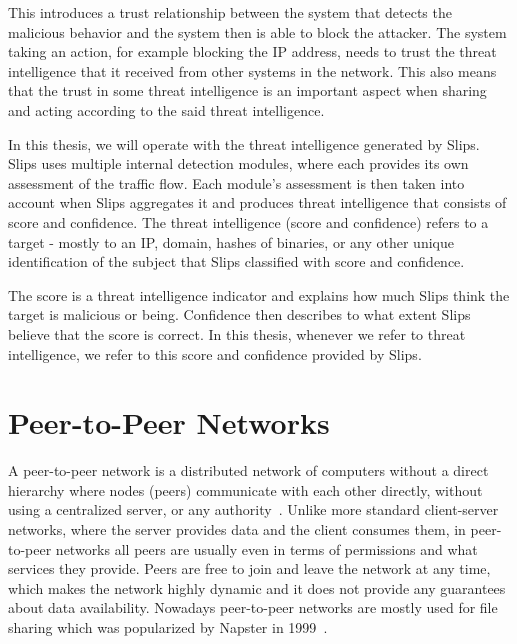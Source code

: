 This introduces a trust relationship between the system that detects the malicious behavior and the system then is able to block the attacker.
The system taking an action, for example blocking the IP address, needs to trust the threat intelligence that it received from other systems in the network.
This also means that the trust in some threat intelligence is an important aspect when sharing and acting according to the said threat intelligence.

In this thesis, we will operate with the threat intelligence generated by Slips.
Slips uses multiple internal detection modules, where each provides its own assessment of the traffic flow. 
Each module's assessment is then taken into account when Slips aggregates it and produces threat intelligence that consists of score and confidence.
The threat intelligence (score and confidence) refers to a target - mostly to an IP, domain, hashes of binaries, or any other unique identification of the subject that Slips classified with score and confidence.

The score is a threat intelligence indicator and explains how much Slips think the target is malicious or being.
Confidence then describes to what extent Slips believe that the score is correct.
In this thesis, whenever we refer to threat intelligence, we refer to this score and confidence provided by Slips.

\section{Peer-to-Peer Networks}
\label{sec:peer-to-peer-networks}
A peer-to-peer network is a distributed network of computers without a direct hierarchy where nodes (peers) communicate with each other directly, without using a centralized server, or any authority~\cite{schollmeier}.
Unlike more standard client-server networks, where the server provides data and the client consumes them, in peer-to-peer networks all peers are usually even in terms of permissions and what services they provide.
Peers are free to join and leave the network at any time, which makes the network highly dynamic and it does not provide any guarantees about data availability.
Nowadays peer-to-peer networks are mostly used for file sharing which was popularized by Napster in 1999~\cite{saroiu}.